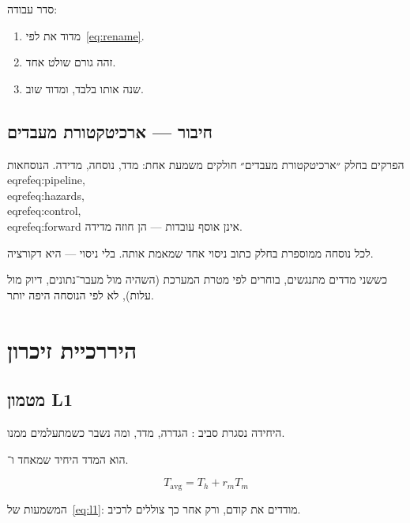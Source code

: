 סדר עבודה:
\begin{enumerate}
\item[(\textbf{א})] מדוד את  לפי~\eqref{eq:rename}.
\item[(\textbf{ב})] זהה גורם שולט אחד.
\item[(\textbf{ג})] שנה אותו בלבד, ומדוד שוב.
\end{enumerate}


\chapter{חיבור — ארכיטקטורת מעבדים}
\label{ch:bridge-pipeline}

הפרקים בחלק ״ארכיטקטורת מעבדים״ חולקים משמעת אחת: מדד, נוסחה, מדידה.
הנוסחאות \\eqref{eq:pipeline}, \\eqref{eq:hazards}, \\eqref{eq:control}, \\eqref{eq:forward} אינן אוסף עובדות — הן חוזה מדידה.

\begin{keybox}[frametitle={חוזה החלק}]
לכל נוסחה ממוספרת בחלק כתוב ניסוי אחד שמאמת אותה. בלי ניסוי — היא דקורציה.
\end{keybox}

כששני מדדים מתנגשים, בוחרים לפי מטרת המערכת (השהיה מול מעבר־נתונים, דיוק מול עלות),
לא לפי הנוסחה היפה יותר.

\part{היררכיית זיכרון}

\chapter{מטמון L1}
\label{ch:l1}

היחידה נסגרת סביב : הגדרה, מדד, ומה נשבר כשמתעלמים ממנו.

\begin{keybox}[frametitle={רעיון מפתח — מטמון L1}]
 הוא המדד היחיד שמאחד  ו־.
\end{keybox}

\begin{equation}
\label{eq:l1}
T_{\mathrm{avg}}=T_h+r_m T_m
\end{equation}

המשמעות של~\eqref{eq:l1}: מודדים את  קודם, ורק אחר כך צוללים לרכיב.


